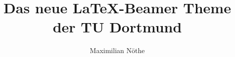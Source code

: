 \documentclass{beamer}
\title{Das neue \LaTeX-Beamer Theme der TU Dortmund}
\author{Maximilian Nöthe}
\institute{Lehrstuhl E5b/ \\Fakultät Physik}
\begin{document}
\begin{frame}
    \titlepage
\end{frame}
\end{document}
